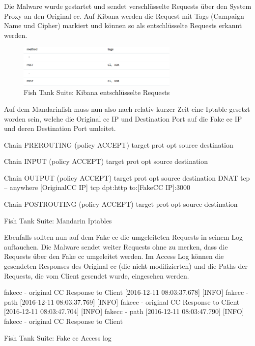 Die Malware wurde gestartet und sendet verschlüsselte Requests über den System Proxy an den Original \gls{cc}.
Auf Kibana werden die Request mit Tags (Campaign Name und Cipher) markiert und können so als entschlüsselte Requests erkannt werden.

\begin{figure}[H]
	\centering
	\includegraphics[width=0.7\textwidth]{img/kibana-decrypt.png}
	\caption{Fish Tank Suite: Kibana entschlüsselte Requests}
	\label{fig:kibana-decrypt}
\end{figure}


Auf dem Mandarinfish muss nun also nach relativ kurzer Zeit eine Iptable gesetzt worden sein, welche die Original \gls{cc} IP und Destination Port auf die Fake \gls{cc} IP und deren Destination Port umleitet.

\begin{listing}[H]
\begin{fancycode}
Chain PREROUTING (policy ACCEPT)
target     prot opt source               destination         

Chain INPUT (policy ACCEPT)
target     prot opt source               destination         

Chain OUTPUT (policy ACCEPT)
target     prot opt source               destination         
DNAT       tcp  --  anywhere             [OriginalCC IP]  tcp dpt:http to:[FakeCC IP]:3000

Chain POSTROUTING (policy ACCEPT)
target     prot opt source               destination 
\end{fancycode}
\caption{Fish Tank Suite: Mandarin Iptables}
\label{lst:mandarin-http-Iptable}
\end{listing}

Ebenfalls sollten nun auf dem Fake \gls{cc} die umgeleiteten Requests in seinem Log auftauchen. Die Malware sendet weiter Requests ohne zu merken, dass die Requests über den Fake \gls{cc} umgeleitet werden.
Im Access Log können die gesendeten Responses des Original \gls{cc} (die nicht modifizierten) und die Paths der Requests, die vom Client gesendet wurde, eingesehen werden.

\begin{listing}[H]
\begin{fancycode}
[2016-12-11 08:03:27.457] [INFO] fakecc - original CC Response to Client
[2016-12-11 08:03:37.678] [INFO] fakecc - path
[2016-12-11 08:03:37.769] [INFO] fakecc - original CC Response to Client
[2016-12-11 08:03:47.704] [INFO] fakecc - path
[2016-12-11 08:03:47.790] [INFO] fakecc - original CC Response to Client
\end{fancycode}
\caption{Fish Tank Suite: Fake \gls{cc} Access log}
\label{lst:fake-cc-access-log}
\end{listing}



